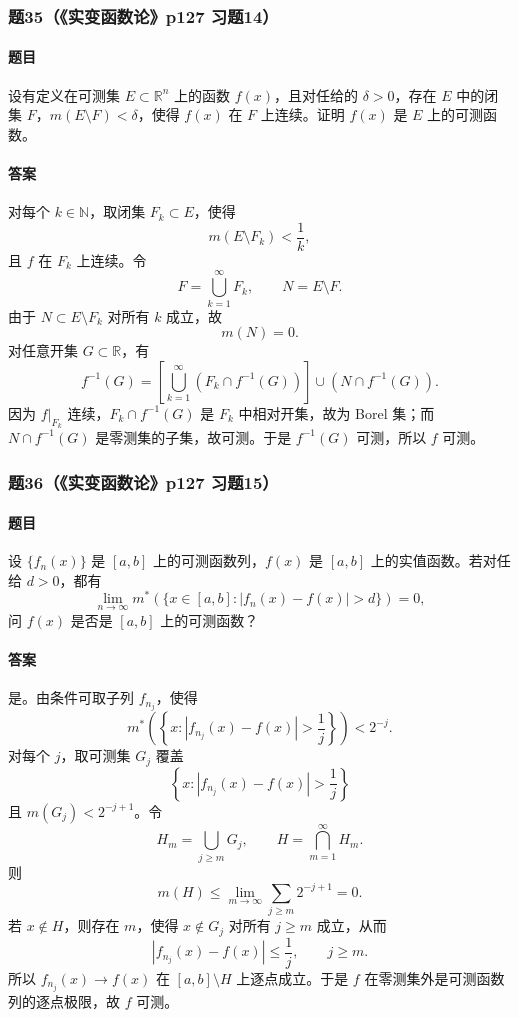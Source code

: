 \documentclass{article}
\newcommand{\R}{\mathbb{R}}
\newcommand{\N}{\mathbb{N}}
\newcommand{\meas}{m}
\newcommand{\mouter}{m^*}
\begin{document}
	\subsubsection*{题35（《实变函数论》p127 习题14）}
	\paragraph{题目}设有定义在可测集 $E\subset\R^n$ 上的函数 $f(x)$，且对任给的 $\delta>0$，存在 $E$ 中的闭集 $F$，$\meas(E\setminus F)<\delta$，使得 $f(x)$ 在 $F$ 上连续。证明 $f(x)$ 是 $E$ 上的可测函数。
	
	\paragraph{答案}对每个 $k\in\N$，取闭集 $F_k\subset E$，使得
	\[
	\meas(E\setminus F_k)<\frac1k,
	\]
	且 $f$ 在 $F_k$ 上连续。令
	\[
	F=\bigcup_{k=1}^{\infty}F_k,
	\qquad
	N=E\setminus F.
	\]
	由于 $N\subset E\setminus F_k$ 对所有 $k$ 成立，故
	\[
	\meas(N)=0.
	\]
	对任意开集 $G\subset\R$，有
	\[
	f^{-1}(G)=\left[\bigcup_{k=1}^{\infty}(F_k\cap f^{-1}(G))\right]\cup(N\cap f^{-1}(G)).
	\]
	因为 $f|_{F_k}$ 连续，$F_k\cap f^{-1}(G)$ 是 $F_k$ 中相对开集，故为 Borel 集；而 $N\cap f^{-1}(G)$ 是零测集的子集，故可测。于是 $f^{-1}(G)$ 可测，所以 $f$ 可测。
	
	\subsubsection*{题36（《实变函数论》p127 习题15）}
	\paragraph{题目}设 $\{f_n(x)\}$ 是 $[a,b]$ 上的可测函数列，$f(x)$ 是 $[a,b]$ 上的实值函数。若对任给 $d>0$，都有
	\[
	\lim_{n\to\infty}\mouter\left(\{x\in[a,b]:|f_n(x)-f(x)|>d\}\right)=0,
	\]
	问 $f(x)$ 是否是 $[a,b]$ 上的可测函数？
	
	\paragraph{答案}是。由条件可取子列 $f_{n_j}$，使得
	\[
	\mouter\left(\left\{x:|f_{n_j}(x)-f(x)|>\frac1j\right\}\right)<2^{-j}.
	\]
	对每个 $j$，取可测集 $G_j$ 覆盖
	\[
	\left\{x:|f_{n_j}(x)-f(x)|>\frac1j\right\}
	\]
	且 $\meas(G_j)<2^{-j+1}$。令
	\[
	H_m=\bigcup_{j\ge m}G_j,
	\qquad
	H=\bigcap_{m=1}^{\infty}H_m.
	\]
	则
	\[
	\meas(H)\le \lim_{m\to\infty}\sum_{j\ge m}2^{-j+1}=0.
	\]
	若 $x\notin H$，则存在 $m$，使得 $x\notin G_j$ 对所有 $j\ge m$ 成立，从而
	\[
	|f_{n_j}(x)-f(x)|\le\frac1j,
	\qquad j\ge m.
	\]
	所以 $f_{n_j}(x)\to f(x)$ 在 $[a,b]\setminus H$ 上逐点成立。于是 $f$ 在零测集外是可测函数列的逐点极限，故 $f$ 可测。
	
\end{document}
